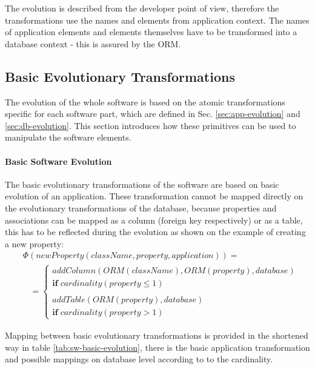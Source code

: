 \documentclass[runningheads]{comsis}
\begin{document}
The evolution is described from the developer point of view, therefore the transformations use the names and elements from application context. The names of application elements and elements themselves have to be transformed into a database context - this is assured by the ORM.



\subsection{Basic Evolutionary Transformations}
\label{sec:sw-basic-evolution}
The evolution of the whole software is based on the atomic transformations specific for each software part, which are defined in Sec. \ref{sec:app-evolution} and \ref{sec:db-evolution}. This section introduces how these primitives can be used to manipulate the software elements.

\paragraph{Basic Software Evolution} The basic evolutionary transformations of the software are based on basic evolution of an application. These transformation cannot be  mapped directly on the evolutionary transformations of the database, because properties and associations can be mapped as a column (foreign key respectively) or as a table, this has to be reflected during the evolution as shown on the example of creating a new property: 
\begin{align}
& \Phi(newProperty(className, property, application)) = \nonumber \\
& \;\;\; =  \begin{cases}
  addColumn(ORM(className), ORM(property), database) \\\mathbf{if} \; cardinality(property \leq 1)  \\\\
  addTable(ORM(property), database) \\
  \mathbf{if} \; cardinality(property > 1)  
 \end{cases}
\end{align}

Mapping between basic evolutionary transformations is provided in the shortened way in table \ref{tab:sw-basic-evolution}, there is the basic application transformation and possible mappings on database level according to to the cardinality.  
\end{document}
